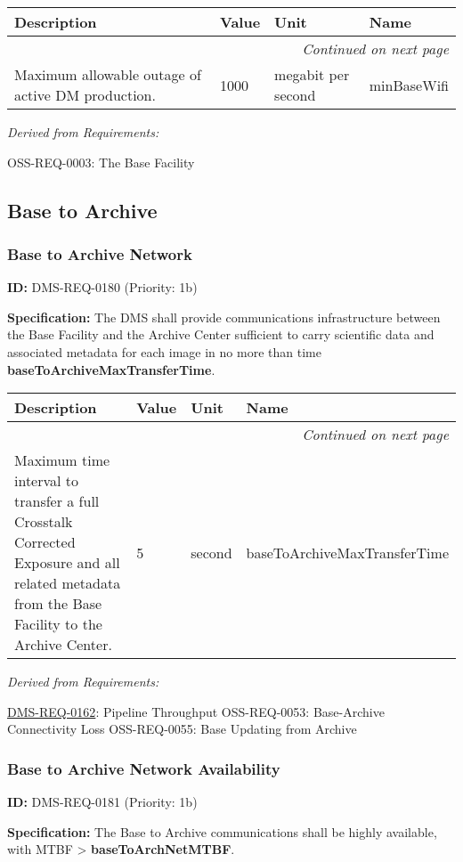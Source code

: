 \documentclass[SE,toc,lsstdraft]{lsstdoc}
\makeatletter
\newcommand{\paramname}[1]{\hspace{0pt}#1}
\newcommand{\unitname}[1]{\hspace{0pt}#1}
\newenvironment{parameters}[0]{%
\setlength\LTleft{0pt}
\setlength\LTright{\fill}
\begin{small}
\begin{longtable}[]{|p{0.49\textwidth}|l|p{0.6in}|p{1.70in}@{}|}

\hline \textbf{Description} & \textbf{Value} & \textbf{Unit} & \textbf{Name} \\ \hline
\endhead

\hline \multicolumn{4}{r}{\emph{Continued on next page}} \\
\endfoot

\hline\hline
\endlastfoot
}{%
\hline
\end{longtable}
\end{small}
}
\makeatother
\begin{document}
\begin{parameters}
Maximum allowable outage of active DM production.
&
1000
&
\unitname{%
megabit per second
}
&
\paramname{%
minBaseWifi
} \\\hline
\end{parameters}

\emph{Derived from Requirements:}

OSS-REQ-0003:
The Base Facility \newline

\subsection{Base to Archive}

\subsubsection{Base to Archive Network}

\label{DMS-REQ-0180}
\textbf{ID:} DMS-REQ-0180 (Priority: 1b)

\textbf{Specification:} The DMS shall provide communications infrastructure between the Base Facility and the Archive Center sufficient to carry scientific data and associated metadata for each image in no more than time \textbf{baseToArchiveMaxTransferTime}.

\begin{parameters}
Maximum time interval to transfer a full Crosstalk Corrected Exposure and all related metadata from the Base Facility to the Archive Center.
&
5
&
\unitname{%
second
}
&
\paramname{%
baseToArchiveMaxTransferTime
} \\\hline
\end{parameters}

\emph{Derived from Requirements:}

\hyperref[DMS-REQ-0162]{DMS-REQ-0162}:
Pipeline Throughput \newline
OSS-REQ-0053:
Base-Archive Connectivity Loss \newline
OSS-REQ-0055:
Base Updating from Archive \newline

\subsubsection{Base to Archive Network Availability}

\label{DMS-REQ-0181}
\textbf{ID:} DMS-REQ-0181 (Priority: 1b)

\textbf{Specification: }The Base to Archive communications shall be highly available, with MTBF >  \textbf{baseToArchNetMTBF}.
\end{document}
